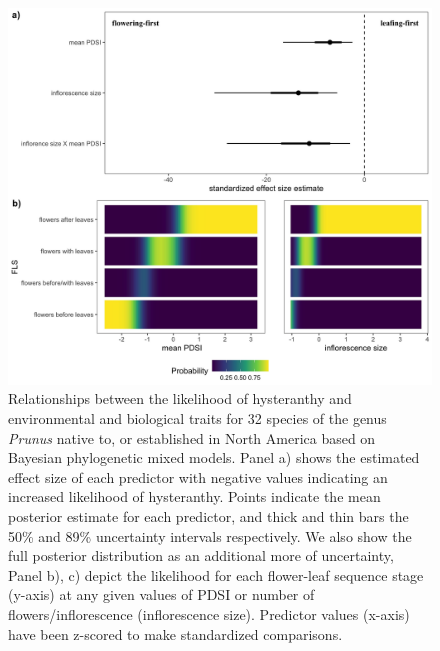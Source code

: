 \documentclass{article}[12pt]
\begin{document}
\begin{figure}[h!]
    \centering
 \includegraphics[width=\textwidth]{..//..//Plots/whatReviwerswant/fullprunus_4manu.jpeg} %
    \caption{Relationships between the likelihood of hysteranthy and environmental and biological traits for 32 species of the genus \emph{Prunus} native to, or established in North America based on Bayesian phylogenetic mixed models. Panel a) shows the estimated effect size of each predictor with negative values indicating an increased likelihood of hysteranthy. Points indicate the mean posterior estimate for each predictor, and thick and thin bars the 50\% and 89\% uncertainty intervals respectively. We also show the full posterior distribution as an additional more of uncertainty, Panel b), c) depict the likelihood for each flower-leaf sequence stage (y-axis) at any given values of PDSI or number of flowers/inflorescence (inflorescence size). Predictor values (x-axis) have been z-scored to make standardized comparisons.}
    \label{fig:genus}
\end{figure}
\end{document}
